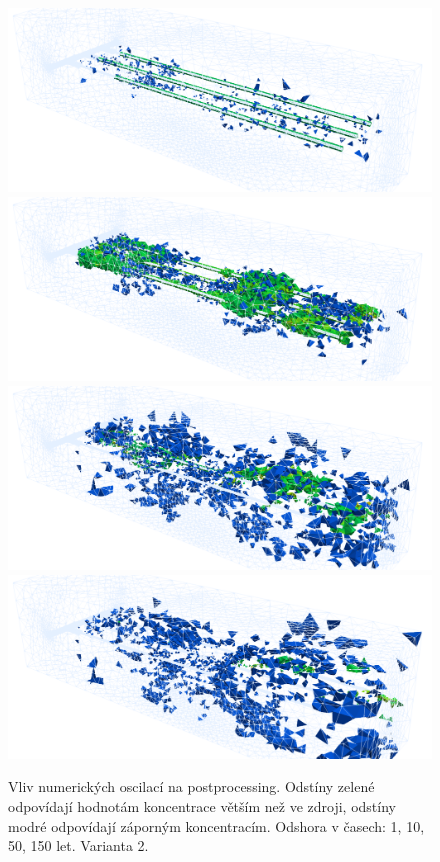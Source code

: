 \documentclass[11pt,a4paper]{article}
\begin{document}
\begin{onehalfspacing}
\begin{figure}[H]
\centering
\includegraphics[width=12cm]{graphics/obr_ralek/var2/oscilace/01a.png}
\includegraphics[width=12cm]{graphics/obr_ralek/var2/oscilace/10a.png}
\includegraphics[width=12cm]{graphics/obr_ralek/var2/oscilace/50a.png}
\includegraphics[width=12cm]{graphics/obr_ralek/var2/oscilace/150a.png}
\caption{Vliv numerických oscilací na postprocessing. Odstíny zelené odpovídají hodnotám koncentrace větším než ve zdroji, odstíny modré odpovídají záporným koncentracím. Odshora v časech: 1, 10, 50, 150 let. Varianta 2.}
\label{oscilace_3D}
\end{figure}


\end{onehalfspacing}
\end{document}
